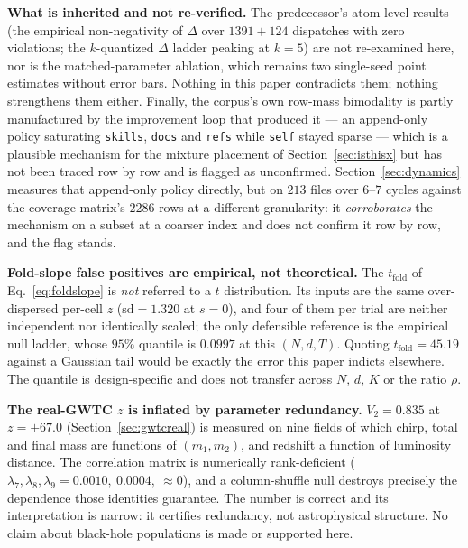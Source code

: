 \documentclass[11pt,a4paper]{article}
\theoremstyle{plain}
\theoremstyle{remark}
\theoremstyle{plain}
\begin{document}
\textbf{What is inherited and not re-verified.} The predecessor's atom-level results (the empirical non-negativity of $\Delta$ over $1391+124$ dispatches with zero violations; the $k$-quantized $\Delta$ ladder peaking at $k=5$) are not re-examined here, nor is the matched-parameter ablation, which remains two single-seed point estimates without error bars. Nothing in this paper contradicts them; nothing strengthens them either. Finally, the corpus's own row-mass bimodality is partly manufactured by the improvement loop that produced it --- an append-only policy saturating \texttt{skills}, \texttt{docs} and \texttt{refs} while \texttt{self} stayed sparse --- which is a plausible mechanism for the mixture placement of Section~\ref{sec:isthisx} but has not been traced row by row and is flagged as unconfirmed. Section~\ref{sec:dynamics} measures that append-only policy directly, but on $213$ files over $6$--$7$ cycles against the coverage matrix's $2286$ rows at a different granularity: it \emph{corroborates} the mechanism on a subset at a coarser index and does not confirm it row by row, and the flag stands.

\textbf{Fold-slope false positives are empirical, not theoretical.} The $t_{\mathrm{fold}}$ of Eq.~\eqref{eq:foldslope} is \emph{not} referred to a $t$ distribution. Its inputs are the same over-dispersed per-cell $z$ ($\mathrm{sd}=1.320$ at $s=0$), and four of them per trial are neither independent nor identically scaled; the only defensible reference is the empirical null ladder, whose $95\%$ quantile is $0.0997$ at this $(N,d,T)$. Quoting $t_{\mathrm{fold}}=45.19$ against a Gaussian tail would be exactly the error this paper indicts elsewhere. The quantile is design-specific and does not transfer across $N$, $d$, $K$ or the ratio $\rho$.

\textbf{The real-GWTC $z$ is inflated by parameter redundancy.} $V_2=0.835$ at $z=+67.0$ (Section~\ref{sec:gwtcreal}) is measured on nine fields of which chirp, total and final mass are functions of $(m_1,m_2)$, and redshift a function of luminosity distance. The correlation matrix is numerically rank-deficient ($\lambda_7,\lambda_8,\lambda_9=0.0010,\ 0.0004,\ \approx0$), and a column-shuffle null destroys precisely the dependence those identities guarantee. The number is correct and its interpretation is narrow: it certifies redundancy, not astrophysical structure. No claim about black-hole populations is made or supported here.
\end{document}
